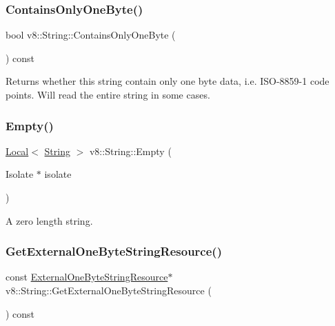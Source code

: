 \subsubsection{\texorpdfstring{Contains\+Only\+One\+Byte()}{ContainsOnlyOneByte()}}
{\footnotesize\ttfamily bool v8\+::\+String\+::\+Contains\+Only\+One\+Byte (\begin{DoxyParamCaption}{ }\end{DoxyParamCaption}) const}

Returns whether this string contain only one byte data, i.\+e. I\+S\+O-\/8859-\/1 code points. Will read the entire string in some cases. \mbox{\label{classv8_1_1String_aa393d47baa54467fe57001065e49194b}} 
\subsubsection{\texorpdfstring{Empty()}{Empty()}}
{\footnotesize\ttfamily \mbox{\hyperlink{classv8_1_1Local}{Local}}$<$ \mbox{\hyperlink{classv8_1_1String}{String}} $>$ v8\+::\+String\+::\+Empty (\begin{DoxyParamCaption}\item[{Isolate $\ast$}]{isolate }\end{DoxyParamCaption})\hspace{0.3cm}{\ttfamily [static]}}

A zero length string. \mbox{\label{classv8_1_1String_af93d92ca10a216be472d1b7c20550f76}} 
\subsubsection{\texorpdfstring{Get\+External\+One\+Byte\+String\+Resource()}{GetExternalOneByteStringResource()}}
{\footnotesize\ttfamily const \mbox{\hyperlink{classv8_1_1String_1_1ExternalOneByteStringResource}{External\+One\+Byte\+String\+Resource}}$\ast$ v8\+::\+String\+::\+Get\+External\+One\+Byte\+String\+Resource (\begin{DoxyParamCaption}{ }\end{DoxyParamCaption}) const}

